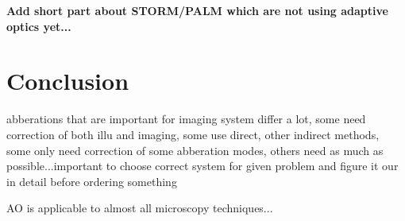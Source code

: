 \textbf{Add short part about STORM/PALM which are not using adaptive optics yet...
} \cite{future_AOM_PALM_1}
\section{Conclusion}
\label{sec:Conclusion}

abberations that are important for imaging system differ a lot, some need 
correction of both illu and imaging, some use direct, other indirect methods, 
some only need correction of some abberation modes, others need as much as 
possible...important to choose correct system for given problem and figure it 
our in detail before ordering something

AO is applicable to almost all microscopy techniques...


\clearpage